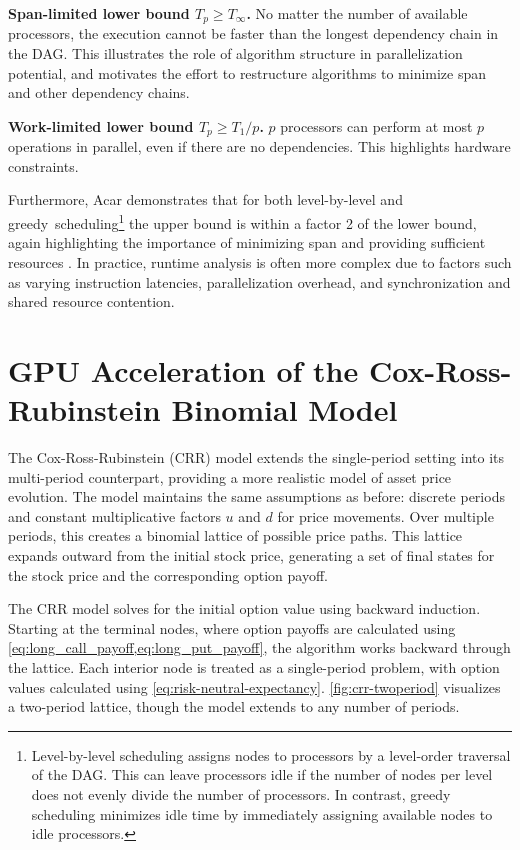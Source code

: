 \documentclass[english,12pt,a4paper,pdftex,sci,utf8]{aaltothesis}
\begin{document}
\vspace{0.5\baselineskip}
\noindent\textbf{Span-limited lower bound $T_p \geq T_\infty$.} No matter the number of available processors, the execution cannot be faster than the longest dependency chain in the DAG. This illustrates the role of algorithm structure in parallelization potential, and motivates the effort to restructure algorithms to minimize span and other dependency chains.

\vspace{0.5\baselineskip}
\noindent\textbf{Work-limited lower bound $T_p \geq T_1/p$.} $p$ processors can perform at most $p$ operations in parallel, even if there are no dependencies. This highlights hardware constraints.

\vspace{\baselineskip}
\noindent Furthermore, Acar demonstrates that for both level-by-level and \mbox{greedy scheduling}\footnote{Level-by-level scheduling assigns nodes to processors by a level-order traversal of the DAG. This can leave processors idle if the number of nodes per level does not evenly divide the number of processors. In contrast, greedy scheduling minimizes idle time by immediately assigning available nodes to idle processors.} the upper bound is within a factor 2 of the lower bound, again highlighting the importance of minimizing span and providing sufficient resources \cite{acar2016parallel}. In practice, runtime analysis is often more complex due to factors such as varying instruction latencies, parallelization overhead, and synchronization and shared resource contention.
\clearpage

\section{GPU Acceleration of the Cox-Ross-Rubinstein Binomial Model} \label{sec:gpu-crr}
The Cox-Ross-Rubinstein (CRR) model \cite{cox1979option} extends the single-period setting into its multi-period counterpart, providing a more realistic model of asset price evolution. The model maintains the same assumptions as before: discrete periods and constant multiplicative factors $u$ and $d$ for price movements. Over multiple periods, this creates a binomial lattice of possible price paths. This lattice expands outward from the initial stock price, generating a set of final states for the stock price and the corresponding option payoff.

The CRR model solves for the initial option value using backward induction. Starting at the terminal nodes, where option payoffs are calculated using \cref{eq:long_call_payoff,eq:long_put_payoff}, the algorithm works backward through the lattice. Each interior node is treated as a single-period problem, with option values calculated using \cref{eq:risk-neutral-expectancy}. \cref{fig:crr-twoperiod} visualizes a two-period lattice, though the model extends to any number of periods.
\end{document}
